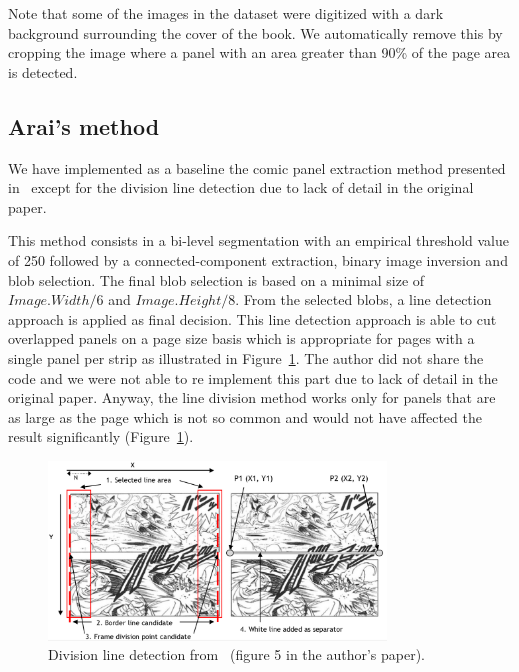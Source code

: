 Note that some of the images in the dataset were digitized with a dark background surrounding the cover of the book.
We automatically remove this by cropping the image where a panel with an area greater than 90\% of the page area is detected.


\subsection{Arai's method} %
\label{sub:ex:panel_extraction_arai}
We have implemented as a baseline the comic panel extraction method presented in~\cite{Arai10} except for the division line detection due to lack of detail in the original paper.

This method consists in a bi-level segmentation with an empirical threshold value of 250 followed by a connected-component extraction, binary image inversion and blob selection.
The final blob selection is based on a minimal size of $Image.Width / 6$ and $Image.Height / 8$.
From the selected blobs, a line detection approach is applied as final decision.
This line detection approach is able to cut overlapped panels on a page size basis which is appropriate for pages with a single panel per strip as illustrated in Figure~\ref{fig:ex:division_line_detection}.
The author did not share the code and we were not able to re implement this part due to lack of detail in the original paper.
Anyway, the line division method works only for panels that are as large as the page which is not so common and would not have affected the result significantly (Figure~\ref{fig:ex:division_line_detection}).

\begin{figure}[h!]
\begin{center}
\includegraphics[width=0.8\textwidth]{division_line_detection_arai10.png}
\caption[Division line detection for panel extraction]{Division line detection from~\cite{Arai10} (figure 5 in the author's paper).}
\label{fig:ex:division_line_detection}
\end{center}
\end{figure}

